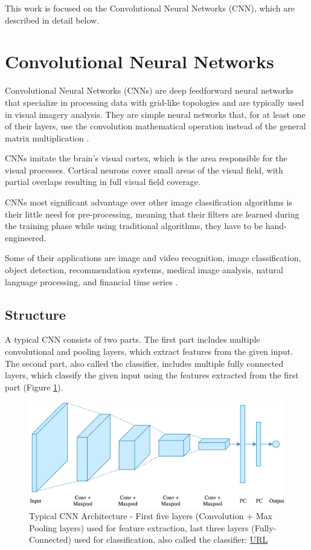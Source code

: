 This work is focused on the Convolutional Neural Networks (CNN), which are described in detail below.

\section{Convolutional Neural Networks}
Convolutional Neural Networks (CNNs) are deep feedforward neural networks that specialize in processing data with grid-like topologies and are typically used in visual imagery analysis. They are simple neural networks that, for at least one of their layers, use the convolution mathematical operation instead of the general matrix multiplication \cite{Goodfellow-et-al-2016}.

CNNs imitate the brain's visual cortex, which is the area responsible for the visual processes. Cortical neurons cover small areas of the visual field, with partial overlaps resulting in full visual field coverage.

CNNs most significant advantage over other image classification algorithms is their little need for pre-processing, meaning that their filters are learned during the training phase while using traditional algorithms, they have to be hand-engineered.

Some of their applications are image and video recognition, image classification, object detection, recommendation systems, medical image analysis, natural language processing, and financial time series \cite{Convolutional-neural-networks-wikipedia}.

\subsection{Structure}
A typical CNN consists of two parts. The first part includes multiple convolutional and pooling layers, which extract features from the given input. The second part, also called the classifier, includes multiple fully connected layers, which classify the given input using the features extracted from the first part (Figure \ref{fig:typical-cnn-architecture}).

\begin{figure} [ht]
	\centering
	\includegraphics[width=\textwidth]{Images/typical-cnn-architecture.png}
	\decoRule
	\caption[Typical CNN Architecture]{Typical CNN Architecture - First five layers (Convolution + Max Pooling layers) used for feature extraction, last three layers (Fully-Connected) used for classification, also called the classifier: \href{https://www.kaggle.com/mauddib/digit-recogniser-tutorial-using-a-cnn-tensorflow}{URL}}
	\label{fig:typical-cnn-architecture}
\end{figure}

